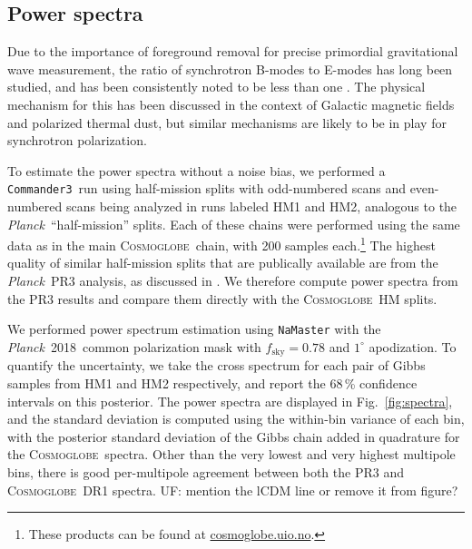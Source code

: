 \documentclass[twocolumn]{../../common/aa}
\def\Planck{\emph{Planck}}
\def\commanderthree{\texttt{Commander3}}
\newcommand{\red}[0]{\color{red}}
\newcommand{\cosmoglobe}{\textsc{Cosmoglobe}}
\begin{document}
\subsection{Power spectra}


Due to the importance of foreground removal for precise primordial gravitational wave measurement, the ratio of synchrotron B-modes to E-modes has long been studied, and has been consistently noted to be less than one \citep{page2007,planck2014-a12,planck2016-l04}. The physical mechanism for this has been discussed in the context of Galactic magnetic fields and polarized thermal dust, but similar mechanisms are likely to be in play for synchrotron polarization.

To estimate the power spectra without a noise bias, we performed a \commanderthree\ run using half-mission splits with odd-numbered scans and even-numbered scans being analyzed in runs labeled HM1 and HM2, analogous to the \Planck\ ``half-mission'' splits. Each of these chains were performed using the same data as in the main \cosmoglobe\ chain, with 200 samples each.\footnote{These products can be found at \url{cosmoglobe.uio.no}.}
The highest quality of similar half-mission splits that are publically available are from the \Planck\ PR3 analysis, as discussed in \citet{planck2016-l04}. We therefore compute power spectra from the PR3 results and compare them directly with the \cosmoglobe\ HM splits.



We performed power spectrum estimation using \texttt{NaMaster} \citep{namaster} with the \Planck\ 2018\ common polarization mask with $f_\mathrm{sky}=0.78$ and $1^\circ$ apodization.
To quantify the uncertainty, we take the cross spectrum for each pair of Gibbs samples from HM1 and HM2 respectively, and report the 68\,\% confidence intervals on this posterior. The power spectra are displayed in Fig.~\ref{fig:spectra}, and the standard deviation is computed using the within-bin variance of each bin, with the posterior standard deviation of the Gibbs chain added in quadrature for the \cosmoglobe\ spectra.
Other than the very lowest and very highest multipole bins, there is good per-multipole agreement between both the PR3 and \cosmoglobe\ DR1 spectra. {\red UF: mention the lCDM line or remove it from figure?}
\end{document}
